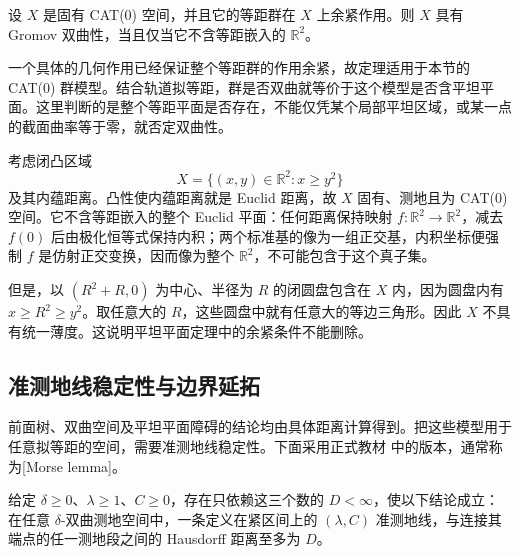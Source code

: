 \begin{theorem}\label{g3:thm:D-flat-plane}
	设 \(X\) 是固有 CAT(0) 空间，并且它的等距群在 \(X\) 上余紧作用。则 \(X\) 具有 Gromov 双曲性，当且仅当它不含等距嵌入的 \(\mathbb R^2\)。
\end{theorem}

一个具体的几何作用已经保证整个等距群的作用余紧，故定理适用于本节的 CAT(0) 群模型。结合轨道拟等距，群是否双曲就等价于这个模型是否含平坦平面。这里判断的是整个等距平面是否存在，不能仅凭某个局部平坦区域，或某一点的截面曲率等于零，就否定双曲性。

\begin{example}\label{g3:exm:D-parabolic-convex-region}
	考虑闭凸区域
	\[
		X=\{(x,y)\in\mathbb R^2:x\ge y^2\}
	\]
	及其内蕴距离。凸性使内蕴距离就是 Euclid 距离，故 \(X\) 固有、测地且为 CAT(0) 空间。它不含等距嵌入的整个 Euclid 平面：任何距离保持映射 \(f:\mathbb R^2\rightarrow\mathbb R^2\)，减去 \(f(0)\) 后由极化恒等式保持内积；两个标准基的像为一组正交基，内积坐标便强制 \(f\) 是仿射正交变换，因而像为整个 \(\mathbb R^2\)，不可能包含于这个真子集。

	但是，以 \((R^2+R,0)\) 为中心、半径为 \(R\) 的闭圆盘包含在 \(X\) 内，因为圆盘内有 \(x\ge R^2\ge y^2\)。取任意大的 \(R\)，这些圆盘中就有任意大的等边三角形。因此 \(X\) 不具有统一薄度。这说明平坦平面定理中的余紧条件不能删除。
\end{example}

\subsection{准测地线稳定性与边界延拓}
\label{g3:subsec:D03:06}

前面树、双曲空间及平坦平面障碍的结论均由具体距离计算得到。把这些模型用于任意拟等距的空间，需要准测地线稳定性。下面采用正式教材 \cite[定理III.H.1.7，第401页]{BridsonHaefliger1999MetricSpaces}中的版本，通常称为[Morse lemma]。

\begin{theorem}\label{g3:thm:D-morse-lemma}
	给定 \(\delta\ge0\)、\(\lambda\ge1\)、\(C\ge0\)，存在只依赖这三个数的 \(D<\infty\)，使以下结论成立：在任意 \(\delta\)-双曲测地空间中，一条定义在紧区间上的 \((\lambda,C)\) 准测地线，与连接其端点的任一测地段之间的 Hausdorff 距离至多为 \(D\)。
\end{theorem}

